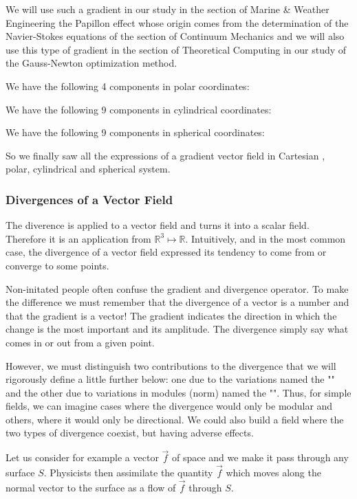 	 We will use such a gradient in our study in the section of Marine \& Weather Engineering the Papillon effect whose origin comes from the determination of the Navier-Stokes equations of the section of Continuum Mechanics and we will also use this type of gradient in the section of Theoretical Computing in our study of the Gauss-Newton optimization method.
	
	We have the following 4 components in polar coordinates:
	 
	We have the following 9 components in cylindrical coordinates:
	 
	We have the following 9 components in spherical coordinates:
	 
	 So we finally saw all the expressions of a gradient vector field in Cartesian , polar, cylindrical and spherical system.
	 
	\subsubsection{Divergences of a Vector Field}\label{divergence vector field}
	The diverence is applied to a vector field and turns it into a scalar field. Therefore it is an application from $\mathbb{R}^3\mapsto \mathbb{R}$. Intuitively, and in the most common case, the divergence of a vector field expressed its tendency to come from or converge to some points.
	\begin{tcolorbox}[title=Remark,colframe=black,arc=10pt]
	Non-initated people often confuse the gradient and divergence operator. To make the difference we must remember that the divergence of a vector is a number and that the gradient is a vector! The gradient indicates the direction in which the change is the most important and its amplitude. The divergence simply say what comes in or out from a given point.
	\end{tcolorbox}	
	However, we must distinguish two contributions to the divergence that we will rigorously define a little further below: one due to the variations named the "" and the other due to variations in modules (norm) named the "". Thus, for simple fields, we can imagine cases where the divergence would only be modular and others, where it would only be directional. We could also build a field where the two types of divergence coexist, but having adverse effects.
	
	Let us consider for example a vector $\vec{f}$ of space and we make it pass through any surface $S$. Physicists then assimilate the quantity $\vec{f}$ which moves along the normal vector to the surface as a flow of $\vec{f}$ through $S$.
	
